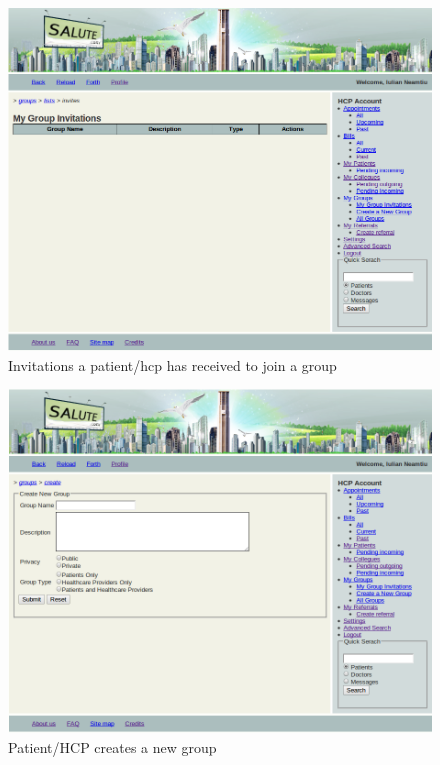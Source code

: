 \begin{figure}
\includegraphics[scale=0.5]{screenshots/my_group_invitations.png}
\caption{Invitations a patient/hcp has received to join a group}
\end{figure}

\begin{figure}
\includegraphics[scale=0.5]{screenshots/create_a_new_group.png}
\caption{Patient/HCP creates a new group}
\end{figure}

